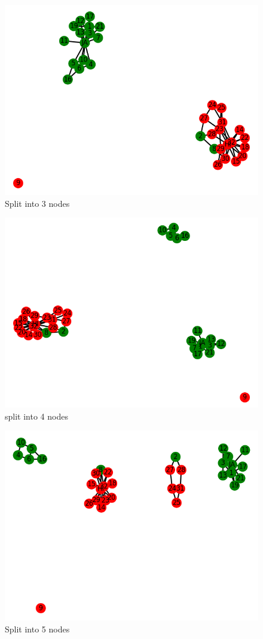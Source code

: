 \documentclass[11pt]{article}
\begin{document}
	\begin{figure}[h!]
		\includegraphics[scale=0.5]{resources/myplot18.png}
		\caption{Split into 3 nodes }
	\end{figure}
	\begin{figure}[h!]
		\includegraphics[scale=0.5]{resources/myplot19.png}
		\caption{split into 4 nodes }
	\end{figure}	
	\begin{figure}[h!]
		\includegraphics[scale=0.5]{resources/myplot20.png}
		\caption{Split into 5 nodes }
	\end{figure}
\end{document}

